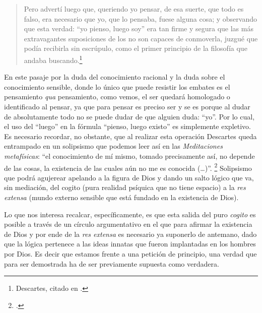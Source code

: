 \begin{quote}
	Pero advertí luego que, queriendo yo pensar, de esa suerte, que todo es falso, era necesario que yo, que lo pensaba, fuese alguna cosa; y observando que esta verdad: \enquote{yo pienso, luego soy} era tan firme y segura que las más extravagantes suposiciones de los  no son capaces de conmoverla, juzgué que podía recibirla sin escrúpulo, como el primer principio de la filosofía que andaba buscando.\footnote{Descartes, citado en \cite[][171]{@7114-CARPIO1980}.}
\end{quote}

En este pasaje por la duda del conocimiento racional y la duda sobre el conocimiento sensible, donde lo único que puede resistir los embates es el pensamiento \emph{qua} pensamiento, como vemos, el ser quedará homologado o identificado al pensar, ya que para pensar es preciso ser y se es porque al dudar de absolutamente todo no se puede dudar de que alguien duda: \enquote{yo}. Por lo cual, el uso del \enquote{luego} en la fórmula \enquote{pienso, luego existo} es simplemente expletivo. Es necesario recordar, no obstante, que al realizar esta operación Descartes queda entrampado en un solipsismo que podemos leer así en las \emph{Meditaciones metafísicas}: \enquote{el conocimiento de mí mismo, tomado precisamente así, no depende de las cosas, la existencia de las cuales aún no me es conocida (\ldots)}. \footcite[][123]{@7116-DESCARTES1941} Solipsismo que podrá agujerear apelando a la figura de Dios y dando un salto lógico que va, sin mediación, del cogito (pura realidad psíquica que no tiene espacio) a la \emph{res extensa} (mundo externo sensible que está fundado en la existencia de Dios).

Lo que nos interesa recalcar, específicamente, es que esta salida del puro \textit{cogito} es posible a través de un círculo argumentativo en el que para afirmar la existencia de Dios y por ende de la \emph{res extensa} es necesario ya suponerlo de antemano, dado que la lógica  pertenece a las ideas innatas que fueron implantadas en los hombres por Dios. Es decir que estamos frente a una petición de principio, una verdad que para ser demostrada ha de ser previamente supuesta como verdadera.

